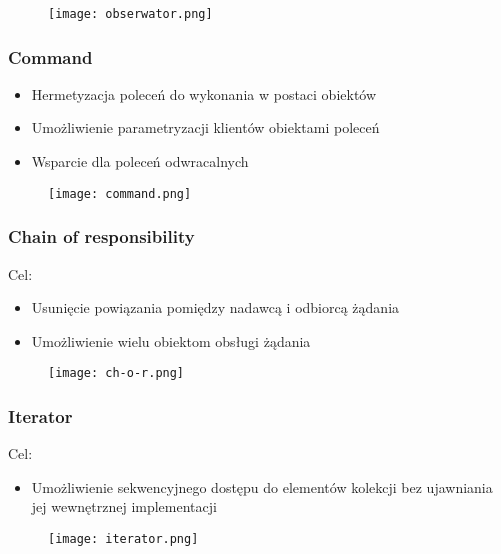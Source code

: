\documentclass[a4paper]{article}
\begin{document}
    \begin{figure}[H]
        \texttt{[image: obserwator.png]}
    \end{figure}


    \subsubsection{Command}
    \begin{itemize}
        \item Hermetyzacja poleceń do wykonania w postaci obiektów
        \item Umożliwienie parametryzacji klientów obiektami poleceń
        \item Wsparcie dla poleceń odwracalnych
    \end{itemize}

    \begin{figure}[H]
        \texttt{[image: command.png]}
    \end{figure}


    \subsubsection{Chain of responsibility}
    Cel:
    \begin{itemize}
        \item  Usunięcie powiązania pomiędzy nadawcą i odbiorcą żądania
        \item Umożliwienie wielu obiektom obsługi żądania
    \end{itemize}


    \begin{figure}[H]
        \texttt{[image: ch-o-r.png]}
    \end{figure}


    \subsubsection{Iterator}
    Cel:
    \begin{itemize}
        \item Umożliwienie sekwencyjnego dostępu do elementów kolekcji bez
        ujawniania jej wewnętrznej implementacji
    \end{itemize}





    \begin{figure}[H]
        \texttt{[image: iterator.png]}
    \end{figure}
\end{document}
